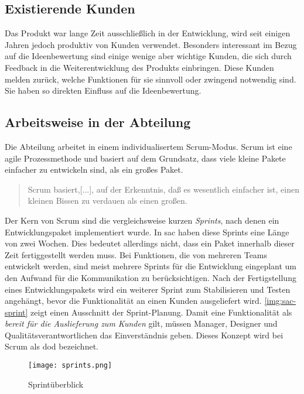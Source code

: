 \subsection{Existierende Kunden}
Das Produkt war lange Zeit ausschließlich in der Entwicklung, wird seit einigen Jahren jedoch produktiv von Kunden verwendet. Besonders 
interessant im Bezug auf die Ideenbewertung sind einige wenige aber wichtige Kunden, die sich durch Feedback in die 
Weiterentwicklung des Produkts einbringen. Diese Kunden melden zurück, welche Funktionen für sie sinnvoll oder 
zwingend notwendig sind. Sie haben so direkten Einfluss auf die Ideenbewertung. 

\subsection{Arbeitsweise in der Abteilung}
Die Abteilung arbeitet in einem individualisertem Scrum-Modus. Scrum ist eine agile Prozessmethode und basiert 
auf dem Grundsatz, dass viele kleine Pakete einfacher zu entwickeln sind, als ein großes Paket. 
\begin{quote} Scrum basiert,[...], auf der Erkenntnis, daß es wesentlich einfacher ist, einen kleinen Bissen zu verdauen als einen großen.\cite{scrum:2018} \end{quote} 
Der Kern von Scrum sind die vergleichsweise kurzen \textit{Sprints}, nach denen ein Entwicklungspaket implementiert wurde. 
In \ac{sac} haben diese Sprints eine Länge von zwei Wochen. Dies bedeutet allerdings nicht, dass ein Paket 
innerhalb dieser Zeit fertiggestellt werden muss. 
Bei Funktionen, die von mehreren Teams entwickelt werden, sind meist mehrere Sprints für die Entwicklung eingeplant um den Aufwand für die Kommunikation zu berücksichtigen. 
Nach der Fertigstellung eines Entwicklungspakets wird ein weiterer Sprint zum Stabilisieren und Testen angehängt, bevor die Funktionalität an einen Kunden
ausgeliefert wird. \autoref{img:sac-sprint} zeigt einen Ausschnitt der Sprint-Planung.
Damit eine Funktionalität als \textit{bereit für die Auslieferung zum Kunden} gilt, müssen Manager, Designer und Qualitätsverantwortlichen das 
Einverständnis geben. Dieses Konzept wird bei Scrum als \ac{dod} bezeichnet. 
\begin{figure}[ht]
	\centering
	\texttt{[image: sprints.png]}
	\caption{Sprintüberblick}
	\label{img:sac-sprint}
\end{figure}



